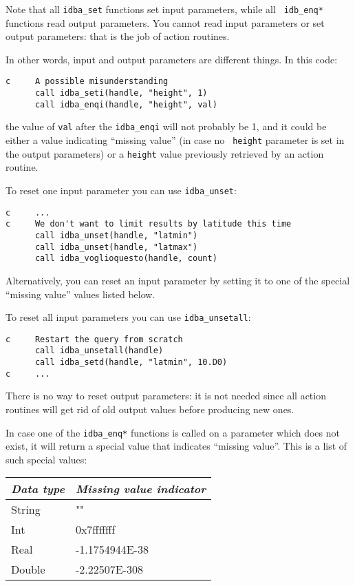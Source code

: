 \documentclass[final,12pt,a4paper,twoside]{book}
\begin{document}
Note that all {\tt idba\_set} functions set input parameters, while all {\tt
idb\_enq*} functions read output parameters.  You cannot read input parameters
or set output parameters: that is the job of action routines.

In other words, input and output parameters are different things.  In this
code:

\begin{verbatim}
c     A possible misunderstanding
      call idba_seti(handle, "height", 1)
      call idba_enqi(handle, "height", val)
\end{verbatim}

the value of {\tt val} after the {\tt idba\_enqi} will not probably be 1, and
it could be either a value indicating ``missing value'' (in case no {\tt
height} parameter is set in the output parameters) or a {\tt height} value
previously retrieved by an action routine.

To reset one input parameter you can use {\tt idba\_unset}:
\label{fun-idba_unset}

\begin{verbatim}
c     ...
c     We don't want to limit results by latitude this time
      call idba_unset(handle, "latmin")
      call idba_unset(handle, "latmax")
      call idba_voglioquesto(handle, count)
\end{verbatim}

Alternatively, you can reset an input parameter by setting it to one of the
special ``missing value'' values listed below.

To reset all input parameters you can use {\tt idba\_unsetall}:
\label{fun-idba_unsetall}

\begin{verbatim}
c     Restart the query from scratch
      call idba_unsetall(handle)
      call idba_setd(handle, "latmin", 10.D0)
c     ...
\end{verbatim}

There is no way to reset output parameters: it is not needed since all action
routines will get rid of old output values before producing new ones.

In case one of the {\tt idba\_enq*} functions is called on a parameter which
does not exist, it will return a special value that indicates ``missing
value''.  This is a list of such special values:

\begin{tabular}{|l|l|}
\hline
{\em Data type} & {\em Missing value indicator}               \\
\hline
String  &  ""			\\
Int     & 0x7fffffff		\\
Real    & -1.1754944E-38	\\
Double  & -2.22507E-308		\\
\hline
\end{tabular}
\end{document}
